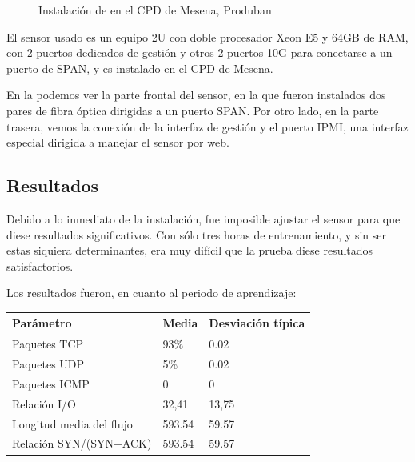 \begin{figure}[hbtp]
\centering
{}
\hfill
{}
%
\caption{Instalación de \redborderddos{} en el CPD de Mesena, Produban}
\end{figure}
%
El sensor usado es un equipo 2U con doble procesador Xeon E5 y 64GB de RAM, con 2 puertos dedicados de gestión y otros 
2 puertos 10G para conectarse a un puerto de SPAN, y es instalado en el CPD de Mesena.

En la  podemos ver la parte frontal del sensor, en la que fueron instalados dos pares de fibra 
óptica dirigidas a un puerto SPAN. Por otro lado, en la parte trasera, vemos la conexión de la interfaz de gestión y el 
puerto IPMI, una interfaz especial dirigida a manejar el sensor por web.

\subsection{Resultados}
Debido a lo inmediato de la instalación, fue imposible ajustar el sensor para que diese resultados significativos. Con 
sólo tres horas de entrenamiento, y sin ser estas siquiera determinantes, era muy difícil que la prueba diese 
resultados satisfactorios.

Los resultados fueron, en cuanto al periodo de aprendizaje:
\begin{table}[htbp]
 \centering
 \begin {tabular}{lll}
  Parámetro & Media & Desviación típica  \\\hline
  Paquetes TCP & 93\% & 0.02 \\
  Paquetes UDP & 5\%  & 0.02 \\
  Paquetes ICMP & 0 & 0      \\
  Relación I/O & 32,41 & 13,75 \\
  Longitud media del flujo & 593.54 & 59.57 \\
  Relación SYN/(SYN+ACK) & 593.54 & 59.57   
 \end {tabular}
\end{table}

